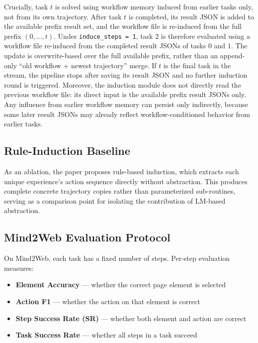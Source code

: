 \documentclass{article}
\providecommand{\tightlist}{%
  \setlength{\itemsep}{0pt}\setlength{\parskip}{0.8em}}
\begin{document}
Crucially, task \(t\) is solved using workflow memory induced from
earlier tasks only, not from its own trajectory. After task \(t\) is
completed, its result JSON is added to the available prefix result set,
and the workflow file is re-induced from the full prefix
\((0,\dots,t)\). Under \texttt{induce\_steps = 1}, task \(2\) is
therefore evaluated using a workflow file re-induced from the completed
result JSONs of tasks \(0\) and \(1\). The update is overwrite-based
over the full available prefix, rather than an append-only ``old
workflow + newest trajectory'' merge.
If \(t\) is the final task in the stream, the pipeline stops after
saving its result JSON and no further induction round is triggered.
Moreover, the induction module does not directly read the previous
workflow file: its direct input is the available prefix result JSONs
only. Any influence from earlier workflow memory can persist only
indirectly, because some later result JSONs may already reflect
workflow-conditioned behavior from earlier tasks.

\subsection{Rule-Induction
Baseline}\label{rule-induction-baseline}

As an ablation, the paper proposes rule-based induction, which extracts
each unique experience's action sequence directly without abstraction.
This produces complete concrete trajectory copies rather than
parameterized sub-routines, serving as a comparison point for isolating
the contribution of LM-based abstraction.

\subsection{Mind2Web Evaluation
Protocol}\label{mind2web-evaluation-protocol}

On Mind2Web, each task has a fixed number of steps. Per-step evaluation
measures:

\begin{itemize}
\tightlist
\item
  \textbf{Element Accuracy} --- whether the correct page element is
  selected
\item
  \textbf{Action F1} --- whether the action on that element is correct
\item
  \textbf{Step Success Rate (SR)} --- whether both element and action
  are correct
\item
  \textbf{Task Success Rate} --- whether all steps in a task succeed
\end{itemize}
\end{document}
